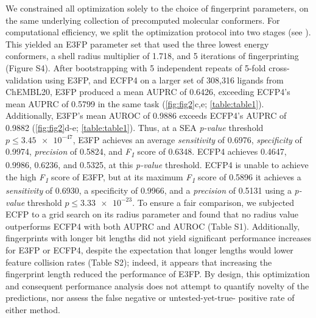 \documentclass[../main.tex]{subfiles}
\begin{document}
\begin{refsection}
We constrained all optimization solely to the choice of fingerprint parameters, on the same underlying collection of precomputed molecular conformers.
For computational efficiency, we split the optimization protocol into two stages (see ).
This yielded an E3FP parameter set that used the three lowest energy conformers, a shell radius multiplier of 1.718, and 5 iterations of fingerprinting  (Figure S4).
After bootstrapping with 5 independent repeats of 5-fold cross-validation using E3FP, and ECFP4 on a larger set of 308,316 ligands from ChEMBL20, E3FP produced a mean AUPRC of 0.6426, exceeding ECFP4's mean AUPRC of 0.5799 in the same task (\cref{fig:fig2}c,e; \cref{table:table1}).
Additionally, E3FP's mean AUROC of 0.9886 exceeds ECFP4's AUPRC of 0.9882 (\cref{fig:fig2}d-e; \cref{table:table1}).
Thus, at a SEA \emph{p-value} threshold  $p \le \num{3.45e-47}$, E3FP achieves an average \emph{sensitivity} of 0.6976, \emph{specificity} of 0.9974, \emph{precision} of 0.5824, and  \emph{F\textsubscript{1}} score of 0.6348.
ECFP4 achieves 0.4647, 0.9986, 0.6236, and 0.5325, at this  \emph{p-value} threshold.
ECFP4 is unable to achieve the high  \emph{F\textsubscript{1}} score of E3FP, but at its maximum  \emph{F\textsubscript{1}} score of 0.5896 it achieves a  \emph{sensitivity} of 0.6930, a specificity of 0.9966, and a  \emph{precision} of 0.5131 using a \emph{p-value} threshold $p \le \num{3.33e-23}$.
To ensure a fair comparison, we subjected ECFP to a grid search on its radius parameter and found that no radius value outperforms ECFP4 with both AUPRC and AUROC (Table S1).
Additionally, fingerprints with longer bit lengths did not yield significant performance increases for E3FP or ECFP4, despite the expectation that longer lengths would lower feature collision rates (Table S2); indeed, it appears that increasing the fingerprint length reduced the performance of E3FP.
By design, this optimization and consequent performance analysis does not attempt to quantify novelty of the predictions, nor assess the false negative or untested-yet-true- positive rate of either method.


\end{refsection}
\end{document}
